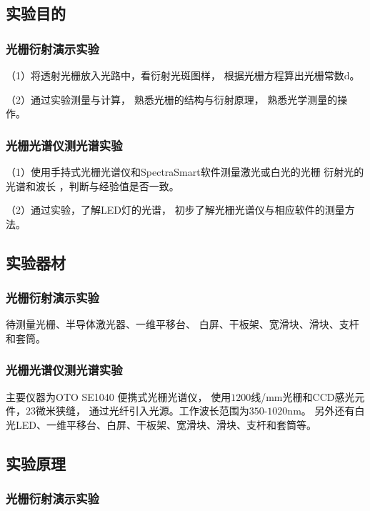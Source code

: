\documentclass[11pt]{article}
\begin{document}
\subsection{实验目的}

\subsubsection*{光栅衍射演示实验} 
（1）将透射光栅放入光路中，看衍射光斑图样，
根据光栅方程算出光栅常数d。

（2）通过实验测量与计算，
熟悉光栅的结构与衍射原理，
熟悉光学测量的操作。

\subsubsection*{光栅光谱仪测光谱实验} 
（1）使用手持式光栅光谱仪和SpectraSmart软件测量激光或白光的光栅
衍射光的光谱和波长
，判断与经验值是否一致。

（2）通过实验，了解LED灯的光谱，
初步了解光栅光谱仪与相应软件的测量方法。

\subsection{实验器材}

\subsubsection*{光栅衍射演示实验}

待测量光栅、半导体激光器、一维平移台、
白屏、干板架、宽滑块、滑块、支杆和套筒。

\subsubsection*{光栅光谱仪测光谱实验}

主要仪器为OTO SE1040 便携式光栅光谱仪，
使用$1200$线/mm光栅和CCD感光元件，$23$微米狭缝，
通过光纤引入光源。工作波长范围为$350$-$1020$nm。
另外还有白光LED、一维平移台、白屏、干板架、宽滑块、滑块、支杆和套筒等。

\subsection{实验原理}

\subsubsection*{光栅衍射演示实验}
\end{document}
